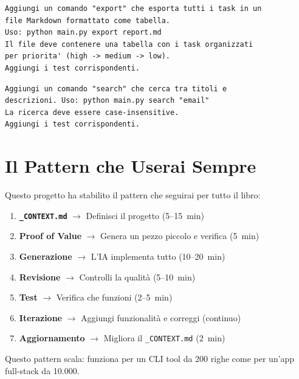 \begin{praticabox}[title={Pratica --- Esporta in formato Markdown}]
\begin{lstlisting}[language={}]
Aggiungi un comando "export" che esporta tutti i task in un
file Markdown formattato come tabella.
Uso: python main.py export report.md
Il file deve contenere una tabella con i task organizzati
per priorita' (high -> medium -> low).
Aggiungi i test corrispondenti.
\end{lstlisting}
\end{praticabox}

\begin{praticabox}[title={Pratica --- Ricerca per testo}]
\begin{lstlisting}[language={}]
Aggiungi un comando "search" che cerca tra titoli e
descrizioni. Uso: python main.py search "email"
La ricerca deve essere case-insensitive.
Aggiungi i test corrispondenti.
\end{lstlisting}
\end{praticabox}

\section{Il Pattern che Userai Sempre}

Questo progetto ha stabilito il pattern che seguirai per tutto il libro:

\begin{enumerate}
  \item \textbf{\texttt{\_CONTEXT.md}} $\rightarrow$ Definisci il progetto (5--15~min)
  \item \textbf{Proof of Value} $\rightarrow$ Genera un pezzo piccolo e verifica (5~min)
  \item \textbf{Generazione} $\rightarrow$ L'IA implementa tutto (10--20~min)
  \item \textbf{Revisione} $\rightarrow$ Controlli la qualità (5--10~min)
  \item \textbf{Test} $\rightarrow$ Verifica che funzioni (2--5~min)
  \item \textbf{Iterazione} $\rightarrow$ Aggiungi funzionalità e correggi (continuo)
  \item \textbf{Aggiornamento} $\rightarrow$ Migliora il \texttt{\_CONTEXT.md} (2~min)
\end{enumerate}

Questo pattern scala: funziona per un CLI tool da 200 righe come per un'app full-stack da 10.000.

